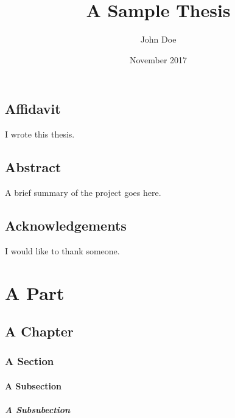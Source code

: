 \documentclass[pdftex,a4paper,twoside,bigchapter,bibtotoc,11pt]{scrbook}
\title{A Sample Thesis}
\author{John Doe}
\date{November 2017}
\begin{document}
\maketitle

\chapter*{Affidavit}
I wrote this thesis.

\chapter*{Abstract}

A brief summary of the project goes here.


\chapter*{Acknowledgements}

I would like to thank someone.

\frontmatter

\tableofcontents

\listoffigures

\listoftables

\mainmatter

\part*{A Part}

\chapter{A Chapter}
\label{ch:intro}

\section{A Section}

\subsection{A Subsection}

\subsubsection{A Subsubection}

\lipsum[1]
\end{document}
